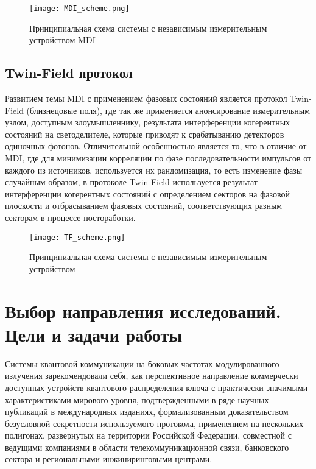  \begin{figure}[ht]
  \centering
  \texttt{[image: MDI\_scheme.png]}
  \caption{Принципиальная схема системы с независимым измерительным устройством MDI}
  \label{fig:MDI_scheme}
\end{figure}


\subsection{Twin-Field протокол} \label{subsec:ch1/sec7/sub4}


Развитием темы MDI с применением фазовых состояний является протокол Twin-Field (близнецовые поля), где так же применяется анонсирование измерительным узлом, доступным злоумышленнику, результата интерференции когерентных состояний на светоделителе, которые приводят к срабатыванию детекторов одиночных фотонов. Отличительной особенностью является то, что в отличие от MDI, где для минимизации корреляции по фазе последовательности импульсов от каждого из источников, используется их рандомизация, то есть изменение фазы случайным образом, в протоколе Twin-Field используется результат интерференции когерентных состояний с определением секторов на фазовой плоскости и отбрасыванием фазовых состояний, соответствующих разным секторам в процессе постоработки.

 
 \begin{figure}[ht]
  \centering
  \texttt{[image: TF\_scheme.png]}
  \caption{Принципиальная схема системы с независимым измерительным устройством}
  \label{fig:TF_scheme}
\end{figure}

\section{Выбор направления исследований. Цели и задачи работы} \label{sec:ch1/sec8}

Системы квантовой коммуникации на боковых частотах модулированного излучения зарекомендовали себя, как перспективное направление коммерчески доступных устройств квантового распределения ключа с практически значимыми характеристиками мирового уровня, подтвержденными в ряде научных публикаций в международных изданиях, формализованным доказательством безусловной секретности используемого протокола, применением на нескольких полигонах, развернутых на территории Российской Федерации, совместной с ведущими компаниями в области телекоммуникационной связи, банковского сектора и региональными инжиниринговыми центрами. 


